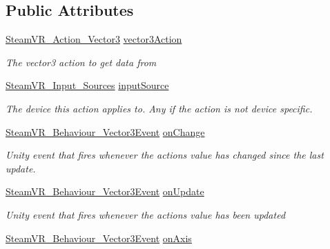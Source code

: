 \subsection*{Public Attributes}
\begin{DoxyCompactItemize}
\item 
\mbox{\hyperlink{class_valve_1_1_v_r_1_1_steam_v_r___action___vector3}{Steam\+V\+R\+\_\+\+Action\+\_\+\+Vector3}} \mbox{\hyperlink{class_valve_1_1_v_r_1_1_steam_v_r___behaviour___vector3_a21998c8b86b236704a56c430753c7bb3}{vector3\+Action}}
\begin{DoxyCompactList}\small\item\em The vector3 action to get data from \end{DoxyCompactList}\item 
\mbox{\hyperlink{namespace_valve_1_1_v_r_a82e5bf501cc3aa155444ee3f0662853f}{Steam\+V\+R\+\_\+\+Input\+\_\+\+Sources}} \mbox{\hyperlink{class_valve_1_1_v_r_1_1_steam_v_r___behaviour___vector3_a1a5505ef46de1dcd8970b9243fd6aa6a}{input\+Source}}
\begin{DoxyCompactList}\small\item\em The device this action applies to. Any if the action is not device specific. \end{DoxyCompactList}\item 
\mbox{\hyperlink{class_valve_1_1_v_r_1_1_steam_v_r___behaviour___vector3_event}{Steam\+V\+R\+\_\+\+Behaviour\+\_\+\+Vector3\+Event}} \mbox{\hyperlink{class_valve_1_1_v_r_1_1_steam_v_r___behaviour___vector3_a10ba307be191067a0432ea3ec0d09840}{on\+Change}}
\begin{DoxyCompactList}\small\item\em Unity event that fires whenever the action\textquotesingle{}s value has changed since the last update. \end{DoxyCompactList}\item 
\mbox{\hyperlink{class_valve_1_1_v_r_1_1_steam_v_r___behaviour___vector3_event}{Steam\+V\+R\+\_\+\+Behaviour\+\_\+\+Vector3\+Event}} \mbox{\hyperlink{class_valve_1_1_v_r_1_1_steam_v_r___behaviour___vector3_a78221d0e4458486e1be9d191ebab31fb}{on\+Update}}
\begin{DoxyCompactList}\small\item\em Unity event that fires whenever the action\textquotesingle{}s value has been updated \end{DoxyCompactList}\item 
\mbox{\hyperlink{class_valve_1_1_v_r_1_1_steam_v_r___behaviour___vector3_event}{Steam\+V\+R\+\_\+\+Behaviour\+\_\+\+Vector3\+Event}} \mbox{\hyperlink{class_valve_1_1_v_r_1_1_steam_v_r___behaviour___vector3_a463f57ec60c91ed45387c57adbd5abff}{on\+Axis}}

\end{DoxyCompactItemize}
